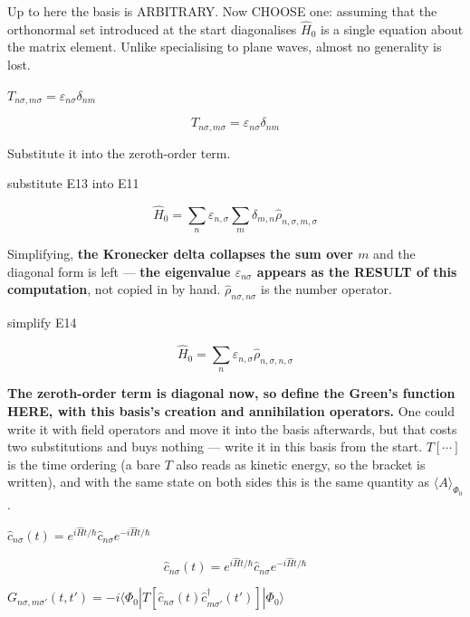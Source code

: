 \documentclass[dvipdfmx]{article}
\begin{document}
Up to here the basis is ARBITRARY. Now CHOOSE one: assuming that the orthonormal set introduced at the start diagonalises $\hat H_0$ is a single equation about the matrix element. Unlike specialising to plane waves, almost no generality is lost.

$T_{n\sigma,m\sigma} = \varepsilon_{n\sigma} \delta_{nm}$

\begin{equation}
  T_{n\sigma,m\sigma} = \varepsilon_{n\sigma} \delta_{nm}
  \label{eq:E13}
\end{equation}

Substitute it into the zeroth-order term.

substitute E13 into E11

\begin{equation}
  \hat H_0 = \sum_{n}{\varepsilon_{n,\sigma} \sum_{m}{\delta_{m, n}  \hat{\rho}_{n,\sigma,m,\sigma}}}
  \label{eq:E14}
\end{equation}

Simplifying, \textbf{the Kronecker delta collapses the sum over $m$} and the diagonal form is left — \textbf{the eigenvalue $\varepsilon_{n\sigma}$ appears as the RESULT of this computation}, not copied in by hand. $\hat\rho_{n\sigma,n\sigma}$ is the number operator.

simplify E14

\begin{equation}
  \hat H_0 = \sum_{n}{\varepsilon_{n,\sigma} \hat{\rho}_{n,\sigma,n,\sigma}}
  \label{eq:E15}
\end{equation}

\textbf{The zeroth-order term is diagonal now, so define the Green's function HERE, with this basis's creation and annihilation operators.} One could write it with field operators and move it into the basis afterwards, but that costs two substitutions and buys nothing — write it in this basis from the start. $T[\cdots]$ is the time ordering (a bare $T$ also reads as kinetic energy, so the bracket is written), and with the same state on both sides this is the same quantity as $\langle A\rangle_{\Phi_0}$.

$\hat c_{n\sigma}(t) = e^{i\hat H t/\hbar} \hat c_{n\sigma} e^{-i\hat H t/\hbar}$

\begin{equation}
  \hat c_{n\sigma}(t) = e^{i\hat H t/\hbar} \hat c_{n\sigma} e^{-i\hat H t/\hbar}
  \label{eq:E16}
\end{equation}

$G_{n\sigma,m\sigma'}(t,t') = -i\langle\Phi_0| T[\hat c_{n\sigma}(t) \hat c^\dagger_{m\sigma'}(t')]|\Phi_0\rangle$
\end{document}
